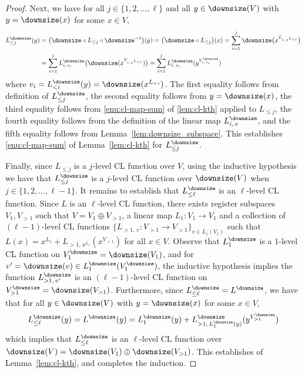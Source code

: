 \begin{proof}
  Next, we have for all $j \in \{1, 2, \ldots, \ell\}$ and all $y \in
  \downsize(V)$ with $y = \downsize(x)$ for some $x \in V$,
  \begin{equation*}
    \begin{split}
      L_{\leq j}^\downsize(y)
      & = \bigl( \downsize \circ L_{\leq j} \circ \downsize^{-1} \bigr) (y)
      = \bigl( \downsize \circ L_{\le j} \bigr) (x)
      = \sum_{i=1}^{j} \downsize \bigl( x^{L_{i,\, x^{L_{<i}}}} \bigr)\\
      & = \sum_{i=1}^{j} L^\downsize_{i,\, v_i}
      \bigl( \downsize(x^{V_{i,\, x^{L_{<i}}}}) \bigr)
      = \sum_{i=1}^{j} L^\downsize_{i,\, v_i} (y^{V^\downsize_{i,\, v_i}})
    \end{split}
  \end{equation*}
  where $v_i = L^\downsize_{< i}(y) = \downsize(x^{L_{<i}})$.
  The first equality follows from definition of $L^\downsize_{\leq j}$, the
  second equality follows from $y = \downsize(x)$, the third equality follows
  from \cref{enu:cl-map-sum} of \cref{lem:cl-kth} applied to $L_{\leq j}$, the
  fourth equality follows from the definition of the linear map
  $L^\downsize_{i,\, v}$, and the fifth equality follows from
  Lemma~\ref{lem:downsize_subspace}.
  This establishes \cref{enu:cl-map-sum} of Lemma~\ref{lem:cl-kth} for
  $L^\downsize_{\leq j}$.

  Finally, since $L_{\leq j}$ is a $j$-level CL function over $V$, using the
  inductive hypothesis we have that $L^\downsize_{\leq j}$ is a $j$-level CL
  function over $\downsize(V)$ when $j \in \{1,2,\ldots,\ell-1\}$.
  It remains to establish that $L_{\leq \ell}^\downsize$ is an $\ell$-level CL
  function.
  Since $L$ is an $\ell$-level CL function, there exists register subspaces
  $V_1, V_{> 1}$ such that $V = V_1 \oplus V_{> 1}$, a linear map $L_1 : V_1 \to
  V_1$ and a collection of $(\ell-1)$-level CL functions $\{ L_{>1,\, v} : V_{>
    1} \to V_{> 1} \}_{v \in L_1(V_1)}$ such that $L(x) = x^{L_1} + L_{>1,\,
    x^{L_1}}(x^{V_{>1}})$ for all $x \in V$.
  Observe that $L_1^\downsize$ is a $1$-level CL function on $V_1^\downsize =
  \downsize(V_1)$, and for $v' = \downsize(v) \in L_1^\downsize(V_1^\downsize)$,
  the inductive hypothesis implies the function $L_{>1,\, v'}^\downsize$ is an
  $(\ell-1)$-level CL function on $V_{>1}^\downsize = \downsize(V_{>1})$.
  Furthermore, since $L^\downsize_{\leq \ell} = L^\downsize$, we have that for
  all $y \in \downsize(V)$ with $y = \downsize(x)$ for some $x \in V$,
  \begin{gather*}
  	L^\downsize_{\leq \ell}(y) = L^\downsize(y) = L_1^\downsize(y) +
    L^\downsize_{>1,\, L_1^\downsize(y)}(y^{V_{>1}^\downsize})
  \end{gather*} 
  which implies that $L^\downsize_{\leq \ell}$ is an $\ell$-level CL function
  over $\downsize(V) = \downsize(V_1) \oplus \downsize(V_{>1})$.
  This establishes  of Lemma~\ref{lem:cl-kth}, and completes
  the induction.
\end{proof}

